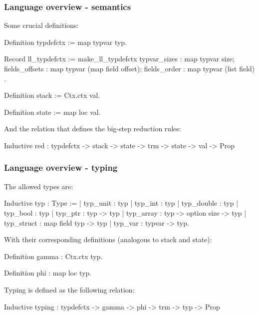 \begin{frame}[fragile]
\frametitle{Language overview - semantics}

Some crucial definitions:

\begin{coqs}
  Definition typdefctx := map typvar typ.

  Record ll_typdefctx := make_ll_typdefctx {
    typvar_sizes				: map typvar size;
    fields_offsets	: map typvar (map field offset);
    fields_order				: map typvar (list field) }.
  
  Definition stack := Ctx.ctx val.

  Definition state := map loc val.
\end{coqs}

\bigskip

And the relation that defines the big-step reduction rules:

\begin{coqs}
Inductive red : typdefctx -> stack -> state -> trm -> state -> val -> Prop
\end{coqs}


\end{frame}


\begin{frame}[fragile]
\frametitle{Language overview - typing}

The allowed types are:

\begin{coqs}
  Inductive typ : Type :=
    | typ_unit : typ
    | typ_int : typ
    | typ_double : typ
    | typ_bool : typ
    | typ_ptr : typ -> typ
    | typ_array : typ -> option size -> typ
    | typ_struct : map field typ -> typ
    | typ_var : typvar -> typ.
\end{coqs}

\bigskip

With their corresponding definitions (analogous to stack and state):

\begin{coqs}
  Definition gamma : Ctx.ctx typ.

  Definition phi : map loc typ.
\end{coqs}

\bigskip

Typing is defined as the following relation:

\begin{coqs}
Inductive typing : typdefctx -> gamma -> phi -> trm -> typ -> Prop
\end{coqs}


\end{frame}


